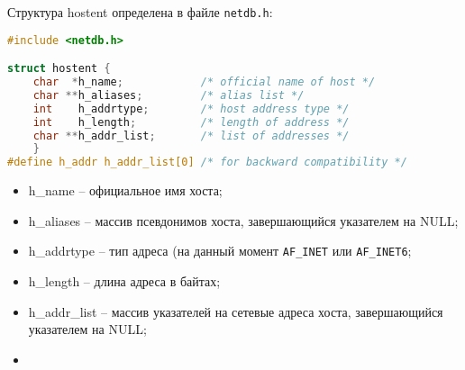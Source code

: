 Структура hostent определена в файле {\tt netdb.h}:
\begin{lstlisting}[language=C]
#include <netdb.h>

struct hostent {
	char  *h_name;            /* official name of host */
	char **h_aliases;         /* alias list */
	int    h_addrtype;        /* host address type */
	int    h_length;          /* length of address */
	char **h_addr_list;       /* list of addresses */
	}
#define h_addr h_addr_list[0] /* for backward compatibility */
\end{lstlisting}
\begin{itemize}
\item h\_name -- официальное имя хоста;
\item h\_aliases -- массив псевдонимов хоста, завершающийся указателем на NULL;
\item h\_addrtype -- тип адреса (на данный момент {\tt AF_INET} или {\tt AF_INET6};
\item h\_length -- длина адреса в байтах;
\item h\_addr\_list -- массив указателей на сетевые адреса хоста, завершающийся указателем на NULL;
\item 
\end{itemize}



